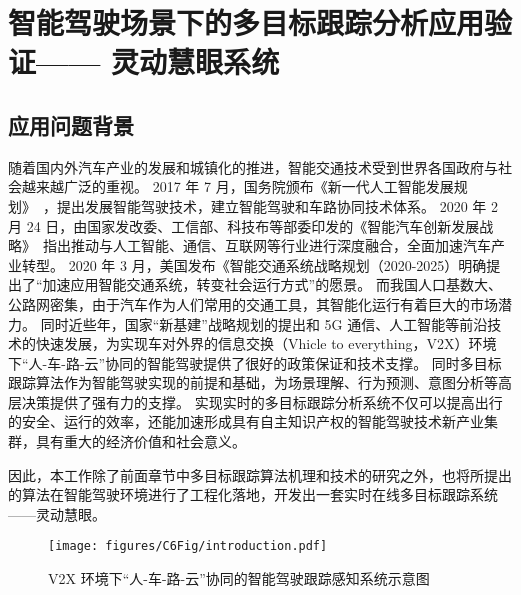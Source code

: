 








\chapter{智能驾驶场景下的多目标跟踪分析应用验证—— 灵动慧眼系统}


\section{应用问题背景}
随着国内外汽车产业的发展和城镇化的推进，智能交通技术受到世界各国政府与社会越来越广泛的重视。
2017 年 7 月，国务院颁布《新一代人工智能发展规划》~\cite{new_ai_plan}，提出发展智能驾驶技术，建立智能驾驶和车路协同技术体系。
2020 年 2 月 24 日，由国家发改委、工信部、科技布等部委印发的《智能汽车创新发展战略》~\cite{car_plan_11}指出推动与人工智能、通信、互联网等行业进行深度融合，全面加速汽车产业转型。
2020 年 3 月，美国发布《智能交通系统战略规划（2020-2025）明确提出了“加速应用智能交通系统，转变社会运行方式”的愿景。
而我国人口基数大、公路网密集，由于汽车作为人们常用的交通工具，其智能化运行有着巨大的市场潜力。
同时近些年，国家“新基建”战略规划的提出和 5G 通信、人工智能等前沿技术的快速发展，为实现车对外界的信息交换（Vhicle to everything，V2X）环境下“人-车-路-云”协同的智能驾驶提供了很好的政策保证和技术支撑。
同时多目标跟踪算法作为智能驾驶实现的前提和基础，为场景理解、行为预测、意图分析等高层决策提供了强有力的支撑。
%
实现实时的多目标跟踪分析系统不仅可以提高出行的安全、运行的效率，还能加速形成具有自主知识产权的智能驾驶技术新产业集群，具有重大的经济价值和社会意义。


因此，本工作除了前面章节中多目标跟踪算法机理和技术的研究之外，也将所提出的算法在智能驾驶环境进行了工程化落地，开发出一套实时在线多目标跟踪系统——灵动慧眼。


\begin{figure*}[ht]
	\centering
	\texttt{[image: figures/C6Fig/introduction.pdf]}
	\caption{V2X 环境下“人-车-路-云”协同的智能驾驶跟踪感知系统示意图}
	\label{fig:introduction}
\end{figure*}


